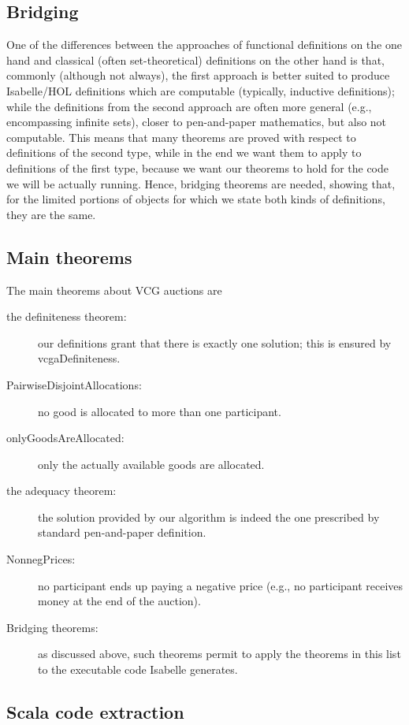 \documentclass[11pt,a4paper]{article}
\begin{document}
\subsection{Bridging}

One of the differences between the approaches of functional
definitions on the one hand and classical (often set-theoretical)
definitions on the other hand is that, commonly (although not always),
the first approach is better suited to produce Isabelle/HOL
definitions which are computable (typically, inductive definitions);
while the definitions from the second approach are often more general
(e.g., encompassing infinite sets), closer to pen-and-paper
mathematics, but also not computable.  This means that many theorems
are proved with respect to definitions of the second type, while in
the end we want them to apply to definitions of the first type,
because we want our theorems to hold for the code we will be actually
running.  Hence, bridging theorems are needed, showing that, for the
limited portions of objects for which we state both kinds of
definitions, they are the same.

\subsection{Main theorems}

The main theorems about VCG auctions are
\begin{description}
  \item[the definiteness theorem:] our definitions grant that there is exactly one solution; this is 
    ensured by vcgaDefiniteness.
  \item[PairwiseDisjointAllocations:] no good is allocated to more than one participant.
  \item[onlyGoodsAreAllocated:] only the actually available goods are allocated.
  \item[the adequacy theorem:] the solution provided by our algorithm is indeed the one prescribed by
    standard pen-and-paper definition.
  \item[NonnegPrices:] no participant ends up paying a negative price 
    (e.g., no participant receives money at the end of the auction).
  \item[Bridging theorems:] as discussed above, such theorems permit to apply the theorems in this 
    list to the executable code Isabelle generates.
\end{description}

\subsection{Scala code extraction}
\end{document}

